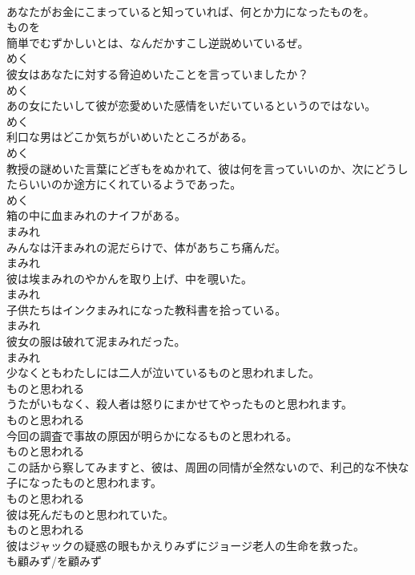 \documentclass[8pt]{extreport}
\begin{document}
\begin{CJK}{UTF8}{min}
\\	あなたがお金にこまっていると知っていれば、何とか力になったものを。	
\\	ものを
\\	簡単でむずかしいとは、なんだかすこし逆説めいているぜ。	
\\	めく
\\	彼女はあなたに対する脅迫めいたことを言っていましたか？	
\\	めく
\\	あの女にたいして彼が恋愛めいた感情をいだいているというのではない。	
\\	めく
\\	利口な男はどこか気ちがいめいたところがある。	
\\	めく
\\	教授の謎めいた言葉にどぎもをぬかれて、彼は何を言っていいのか、次にどうしたらいいのか途方にくれているようであった。	
\\	めく
\\	箱の中に血まみれのナイフがある。	
\\	まみれ
\\	みんなは汗まみれの泥だらけで、体があちこち痛んだ。	
\\	まみれ
\\	彼は埃まみれのやかんを取り上げ、中を覗いた。	
\\	まみれ
\\	子供たちはインクまみれになった教科書を拾っている。	
\\	まみれ
\\	彼女の服は破れて泥まみれだった。	
\\	まみれ
\\	少なくともわたしには二人が泣いているものと思われました。	
\\	ものと思われる
\\	うたがいもなく、殺人者は怒りにまかせてやったものと思われます。	
\\	ものと思われる
\\	今回の調査で事故の原因が明らかになるものと思われる。	
\\	ものと思われる
\\	この話から察してみますと、彼は、周囲の同情が全然ないので、利己的な不快な子になったものと思われます。	
\\	ものと思われる
\\	彼は死んだものと思われていた。	
\\	ものと思われる
\\	彼はジャックの疑惑の眼もかえりみずにジョージ老人の生命を救った。	
\\	も顧みず/を顧みず

\end{CJK}
\end{document}
